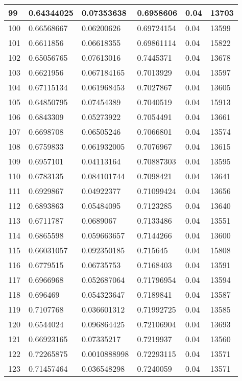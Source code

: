 \begin{longtable}{|l|l|l|l|l|l|}
99 & 0.64344025 & 0.07353638 & 0.6958606 & 0.04 & 13703 \\ \hline 
100 & 0.66568667 & 0.06200626 & 0.69724154 & 0.04 & 13599 \\ \hline 
101 & 0.6611856 & 0.06618355 & 0.69861114 & 0.04 & 15822 \\ \hline 
102 & 0.65056765 & 0.07613016 & 0.7445371 & 0.04 & 13678 \\ \hline 
103 & 0.6621956 & 0.067184165 & 0.7013929 & 0.04 & 13597 \\ \hline 
104 & 0.67115134 & 0.061968453 & 0.7027867 & 0.04 & 13605 \\ \hline 
105 & 0.64850795 & 0.07454389 & 0.7040519 & 0.04 & 15913 \\ \hline 
106 & 0.6843309 & 0.05273922 & 0.7054491 & 0.04 & 13661 \\ \hline 
107 & 0.6698708 & 0.06505246 & 0.7066801 & 0.04 & 13574 \\ \hline 
108 & 0.6759833 & 0.061932005 & 0.7076967 & 0.04 & 13615 \\ \hline 
109 & 0.6957101 & 0.04113164 & 0.70887303 & 0.04 & 13595 \\ \hline 
110 & 0.6783135 & 0.084101744 & 0.7098421 & 0.04 & 13641 \\ \hline 
111 & 0.6929867 & 0.04922377 & 0.71099424 & 0.04 & 13656 \\ \hline 
112 & 0.6893863 & 0.05484095 & 0.7123285 & 0.04 & 13640 \\ \hline 
113 & 0.6711787 & 0.0689067 & 0.7133486 & 0.04 & 13551 \\ \hline 
114 & 0.6865598 & 0.059663657 & 0.7144266 & 0.04 & 13600 \\ \hline 
115 & 0.66031057 & 0.092350185 & 0.715645 & 0.04 & 15808 \\ \hline 
116 & 0.6779515 & 0.06735753 & 0.7168403 & 0.04 & 13591 \\ \hline 
117 & 0.6966968 & 0.052687064 & 0.71796954 & 0.04 & 13594 \\ \hline 
118 & 0.696469 & 0.054323647 & 0.7189841 & 0.04 & 13587 \\ \hline 
119 & 0.7107768 & 0.036601312 & 0.71992725 & 0.04 & 13585 \\ \hline 
120 & 0.6544024 & 0.096864425 & 0.72106904 & 0.04 & 13693 \\ \hline 
121 & 0.66923165 & 0.07335217 & 0.7219937 & 0.04 & 13560 \\ \hline 
122 & 0.72265875 & 0.0010888998 & 0.72293115 & 0.04 & 13571 \\ \hline 
123 & 0.71457464 & 0.036548298 & 0.7240059 & 0.04 & 13571 \\ \hline 

\end{longtable}
